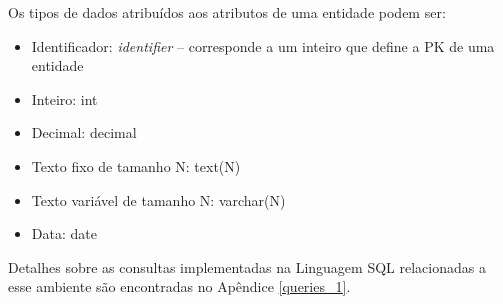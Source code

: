 Os tipos de dados atribuídos aos atributos de uma entidade podem ser:

\begin{itemize}
    \item Identificador: \textit{identifier} -- corresponde a um inteiro que define a PK de uma entidade
    \item Inteiro: int
    \item Decimal: decimal
    \item Texto fixo de tamanho N: text(N)
    \item Texto variável de tamanho N: varchar(N)
    \item Data: date
    
\end{itemize}

Detalhes sobre as consultas implementadas na Linguagem SQL relacionadas a esse ambiente são encontradas no Apêndice \ref{queries_1}.

